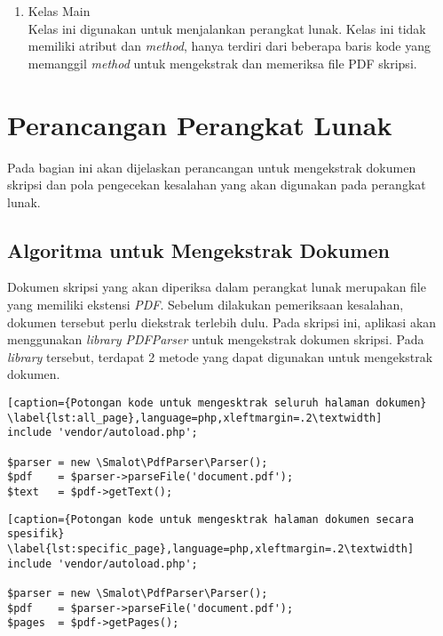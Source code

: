 \begin{enumerate}
\begin{itemize}
			\item getListPage() \\
			Method ini berfungsi untuk mendapatkan halaman daftar isi, daftar gambar, daftar tabel dan daftar referensi.
			
			\item getContent() \\
			Method ini berfungsi untuk mendapatkan halaman konten skripsi dari bab 1 sampai bab 6.
			
		\end{itemize}
	
	\item Kelas Main \\
	Kelas ini digunakan untuk menjalankan perangkat lunak. Kelas ini tidak memiliki atribut dan \textit{method}, hanya terdiri dari beberapa baris kode yang memanggil \textit{method} untuk mengekstrak dan memeriksa file PDF skripsi. 

\end{enumerate} 

\section{Perancangan Perangkat Lunak}
Pada bagian ini akan dijelaskan perancangan untuk mengekstrak dokumen skripsi dan pola pengecekan kesalahan yang akan digunakan pada perangkat lunak.
 
\subsection{Algoritma untuk Mengekstrak Dokumen}
Dokumen skripsi yang akan diperiksa dalam perangkat lunak merupakan file yang memiliki ekstensi \textit{PDF}. Sebelum dilakukan pemeriksaan kesalahan, dokumen tersebut perlu diekstrak terlebih dulu. Pada skripsi ini, aplikasi akan menggunakan \textit{library PDFParser} untuk mengekstrak dokumen skripsi. Pada \textit{library} tersebut, terdapat 2 metode yang dapat digunakan untuk mengekstrak dokumen.
	
\begin{lstlisting}[caption={Potongan kode untuk mengesktrak seluruh halaman dokumen}	\label{lst:all_page},language=php,xleftmargin=.2\textwidth] 
include 'vendor/autoload.php';
	
$parser = new \Smalot\PdfParser\Parser();
$pdf    = $parser->parseFile('document.pdf');
$text   = $pdf->getText();
\end{lstlisting}
	
\begin{lstlisting}[caption={Potongan kode untuk mengesktrak halaman dokumen secara spesifik}
\label{lst:specific_page},language=php,xleftmargin=.2\textwidth] 
include 'vendor/autoload.php';

$parser = new \Smalot\PdfParser\Parser();
$pdf    = $parser->parseFile('document.pdf');
$pages  = $pdf->getPages();
\end{lstlisting}
\medskip


